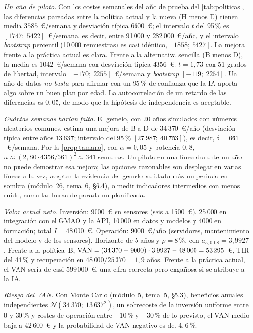 \begin{ejemplo}\label{ej:caso-valor}
\emph{Un año de piloto.} Con los costes semanales del año de prueba del \cref{tab:politicas}, las diferencias pareadas entre la política actual y la nueva (H menos D) tienen media $3585$~€/semana y desviación típica $6600$~€; el intervalo $t$ del 95\,\% es $[1747;\ 5422]$~€/semana, es decir, entre 91\,000 y 282\,000~€/año, y el intervalo \emph{bootstrap} percentil (10\,000 remuestras) es casi idéntico, $[1858;\ 5427]$. La mejora frente a la práctica actual es clara. Frente a la alternativa sencilla (B menos D), la media es $1042$~€/semana con desviación típica $4356$~€: $t=1{,}73$ con 51 grados de libertad, intervalo $[-170;\ 2255]$~€/semana y \emph{bootstrap} $[-119;\ 2254]$. Un año de datos \emph{no basta} para afirmar con un 95\,\% de confianza que la IA aporta algo sobre un buen plan por edad. La autocorrelación de un retardo de las diferencias es $0{,}05$, de modo que la hipótesis de independencia es aceptable.

\emph{Cuántas semanas harían falta.} El gemelo, con 20 años simulados con números aleatorios comunes, estima una mejora de B a D de $34\,370$~€/año (desviación típica entre años $13\,637$; intervalo del 95\,\% $[27\,987;\ 40\,753]$), es decir, $\delta=661$~€/semana. Por la \cref{prop:tamano}, con $\alpha=0{,}05$ y potencia $0{,}8$, $n\approx(2{,}80\cdot4356/661)^{2}\approx341$ semanas. Un piloto en una línea durante un año no puede demostrar esa mejora; las opciones razonables son desplegar en varias líneas a la vez, aceptar la evidencia del gemelo validado más un periodo en sombra (módulo~26, tema~6, §6.4), o medir indicadores intermedios con menos ruido, como las horas de parada no planificada.

\emph{Valor actual neto.} Inversión: 9000~€ en sensores (seis a 1500~€), 25\,000 en integración con el GMAO y la API, 10\,000 en datos y modelos y 4000 en formación; total $I=48\,000$~€. Operación: $9000$~€/año (servidores, mantenimiento del modelo y de los sensores). Horizonte de 5 años y $\rho=8\,\%$, con $a_{5;0{,}08}=3{,}9927$. Frente a la política~B, $\operatorname{VAN}=(34\,370-9000)\cdot3{,}9927-48\,000=53\,295$~€, TIR del 44\,\% y recuperación en $48\,000/25\,370=1{,}9$ años. Frente a la práctica actual, el VAN sería de casi $599\,000$~€, una cifra correcta pero engañosa si se atribuye a la IA.

\emph{Riesgo del VAN.} Con Monte Carlo (módulo~5, tema~5, §5.3), beneficios anuales independientes $\mathcal{N}(34\,370;\ 13\,637^{2})$, un sobrecoste de la inversión uniforme entre 0 y 30\,\% y costes de operación entre $-10\,\%$ y $+30\,\%$ de lo previsto, el VAN medio baja a $42\,600$~€ y la probabilidad de VAN negativo es del $4{,}6\,\%$.
\end{ejemplo}

